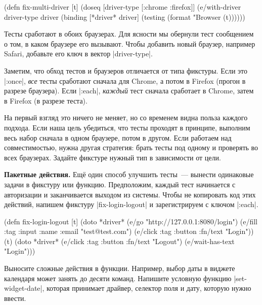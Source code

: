 \begin{english}
  \begin{clojure}
(defn fix-multi-driver [t]
  (doseq [driver-type [:chrome :firefox]]
    (e/with-driver driver-type {} driver
      (binding [*driver* driver]
        (testing (format "Browser %
          (t))))))
  \end{clojure}
\end{english}

Тесты сработают в обоих браузерах. Для ясности мы обернули тест сообщением о
том, в каком браузере его вызывают. Чтобы добавить новый браузер, например
Safari, добавьте его ключ в вектор \spverb|driver-type|.


Заметим, что обход тестов и браузеров отличается от типа фикстуры. Если это
\spverb|:once|, \emph{все} тесты сработают сначала для Chrome, а потом в Firefox
(прогон в разрезе браузера). Если \spverb|:each|, \emph{каждый} тест сначала
сработает в Chrome, затем в Firefox (в разрезе теста).

На первый взгляд это ничего не меняет, но со временем видна польза каждого
подхода. Если наша цель убедиться, что тесты проходят в принципе, выполним весь
набор сначала в одном браузере, потом в другом. Если работаем над
совместимостью, нужна другая стратегия: брать тесты под одному и проверять во
всех браузерах. Задайте фикстуре нужный тип в зависимости от цели.

\textbf{Пакетные действия.} Ещ\"{е} один способ улучшить тесты~--- вынести
одинаковые задачи в фикстуру или функцию. Предположим, каждый тест начинается с
авторизации и заканчивается выходом из системы. Чтобы не копировать код этих
действий, напишем фикстуру \spverb|fix-login-logout| и зарегистрируем с ключом
\spverb|:each|.

\begin{english}
  \begin{clojure}
(defn fix-login-logout [t]
  (doto *driver*
    (e/go "http://127.0.0.1:8080/login")
    (e/fill {:tag :input :name :email} "test@test.com")
    (e/click {:tag :button :fn/text "Login"}))
  (t)
  (doto *driver*
    (e/click {:tag :button :fn/text "Logout"})
    (e/wait-has-text "Login")))
  \end{clojure}
\end{english}

Выносите сложные действия в функции. Например, выбор даты в виджете календаря
может занять до десяти команд. Напишите условную функцию
\spverb|set-widget-date|, которая принимает драйвер, селектор поля и дату,
которую нужно ввести.

